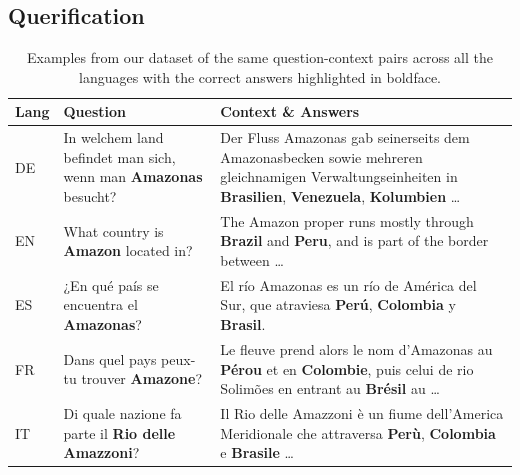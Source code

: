 \subsection{Querification}


\begin{table}[h!]
\fontsize{10}{10}\selectfont
\centering

\begin{tabular}{p{0.75cm}p{4cm}p{10cm}}%
\toprule
Lang & Question                                                      & Context \& Answers                                                                                                                                                                                                                      \\ \midrule
DE       & In welchem land befindet man sich, wenn man \textbf{Amazonas} besucht? & Der Fluss Amazonas gab seinerseits dem Amazonasbecken sowie mehreren gleichnamigen Verwaltungseinheiten in \textbf{Brasilien}, \textbf{Venezuela}, \textbf{Kolumbien} \dots                                                                         \\ \midrule
EN       & What country is \textbf{Amazon} located in?                            & The Amazon proper runs mostly through \textbf{Brazil} and \textbf{Peru}, and is part of the border between \dots                                                                                                                             \\ \midrule
ES       & ¿En qué país se encuentra el \textbf{Amazonas}?                        & El río Amazonas es un río de América del Sur, que atraviesa \textbf{Perú}, \textbf{Colombia} y \textbf{Brasil}.                                                                                                                       \\ \midrule
FR       & Dans quel pays peux-tu trouver \textbf{Amazone}?                       & Le fleuve prend alors le nom d'Amazonas au \textbf{Pérou} et en \textbf{Colombie}, puis celui de rio Solimões en entrant au \textbf{Brésil} au \dots \\ \midrule
IT       & Di quale nazione fa parte il \textbf{Rio delle Amazzoni}?              & Il Rio delle Amazzoni è un fiume dell'America Meridionale che attraversa \textbf{Perù}, \textbf{Colombia} e \textbf{Brasile} \dots                                                                    \\ 
\bottomrule
\end{tabular}

\caption{Examples from our dataset of the same question-context pairs across all the languages with the correct answers highlighted in boldface.}
\label{table:qa_examples}
\end{table}

